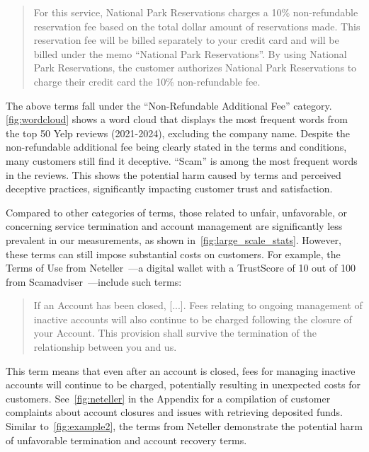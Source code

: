 \begin{quote}
    For this service, National Park Reservations charges a 10\% non-refundable reservation fee based on the total dollar amount of reservations made. This reservation fee will be billed separately to your credit card and will be billed under the memo “National Park Reservations”. By using National Park Reservations, the customer authorizes National Park Reservations to charge their credit card the 10\% non-refundable fee.
\end{quote}



The above terms fall under the ``Non-Refundable Additional Fee'' category. \autoref{fig:wordcloud} shows a word cloud that displays the most frequent words from the top 50 Yelp reviews (2021-2024), excluding the company name. Despite the non-refundable additional fee being clearly stated in the terms and conditions, many customers still find it deceptive. ``Scam'' is among the most frequent words in the reviews. This shows the potential harm caused by \termname terms and perceived deceptive practices, significantly impacting customer trust and satisfaction.



Compared to other categories of \termname terms, those related to unfair, unfavorable, or concerning service termination and account management are significantly less prevalent in our measurements, as shown in~\autoref{fig:large_scale_stats}. However, these terms can still impose substantial costs on customers. For example, the Terms of Use from Neteller~\citep{neteller}---a digital wallet with a TrustScore of 10 out of 100 from Scamadviser~\citep{scamadviser2019algorithm}---include such terms:

\begin{quote}
    If an Account has been closed, [...]. Fees relating to ongoing management of inactive accounts will also continue to be charged following the closure of your Account. This provision shall survive the termination of the relationship between you and us.
\end{quote}


This term means that even after an account is closed, fees for managing inactive accounts will continue to be charged, potentially resulting in unexpected costs for customers. See~\autoref{fig:neteller} in the Appendix for a compilation of customer complaints about account closures and issues with retrieving deposited funds. Similar to~\autoref{fig:example2}, the terms from Neteller demonstrate the potential harm of unfavorable termination and account recovery terms.


